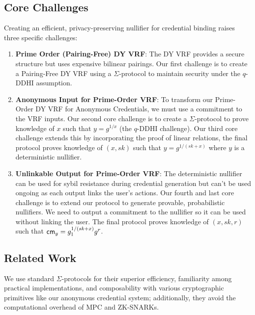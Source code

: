 \subsection{Core Challenges}


Creating an efficient, privacy-preserving nullifier for credential binding raises three specific challenges:

\begin{enumerate}
    \item \textbf{Prime Order (Pairing-Free) DY VRF}: The DY VRF provides a secure structure but uses expensive bilinear pairings. Our first challenge is to create a Pairing-Free DY VRF using a $\Sigma$-protocol to maintain security under the $q$-DDHI assumption.
    
    \item \textbf{Anonymous Input for Prime-Order VRF}: To transform our Prime-Order DY VRF for Anonymous Credentials, we must use a commitment to the VRF inputs. Our second core challenge is to create a $\Sigma$-protocol to prove knowledge of $x$ such that $y = g^{1/x}$ (the $q$-DDHI challenge). Our third core challenge extends this by incorporating the proof of linear relations, the final protocol proves knowledge of $(x, sk)$ such that $y = g^{1/(sk + x)}$ where $y$ is a deterministic nullifier.
    
    \item \textbf{Unlinkable Output for Prime-Order VRF}: The deterministic nullifier can be used for sybil resistance during credential generation but can't be used ongoing as each output links the user's actions. Our fourth and last core challenge is to extend our protocol to generate provable, probabilistic nullifiers. We need to output a commitment to the nullifier so it can be used without linking the user. The final protocol proves knowledge of $(x, sk,r)$ such that $\mathsf{cm}_y = g_1^{1/(sk + x)}g^r$. 
\end{enumerate}



\subsection{Related Work}
We use standard $\Sigma$-protocols for their superior efficiency, familiarity among practical implementations, and composability with various cryptographic primitives like our anonymous credential system; additionally, they avoid the computational overhead of MPC and ZK-SNARKs. 

